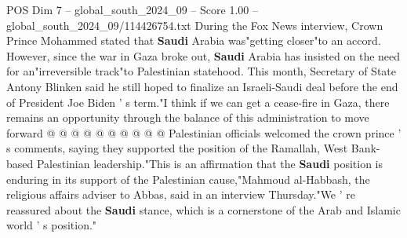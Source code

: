 \begin{textsample}{POS Dim 7 – global\_south\_2024\_09 – Score 1.00 – global\_south\_2024\_09/114426754.txt}
During the Fox News interview, Crown Prince Mohammed stated that \textbf{Saudi} Arabia was"getting closer"to an accord.
However, since the war in Gaza broke out, \textbf{Saudi} Arabia has insisted on the need for an"irreversible track"to Palestinian statehood.
This month, Secretary of State Antony Blinken said he still hoped to finalize an Israeli-Saudi deal before the end of President Joe Biden ' s term."I think if we can get a cease-fire in Gaza, there remains an opportunity through the balance of this administration to move forward @ @ @ @ @ @ @ @ @ @ Palestinian officials welcomed the crown prince ' s comments, saying they supported the position of the Ramallah, West Bank-based Palestinian leadership."This is an affirmation that the \textbf{Saudi} position is enduring in its support of the Palestinian cause,"Mahmoud al-Habbash, the religious affairs adviser to Abbas, said in an interview Thursday."We ' re reassured about the \textbf{Saudi} stance, which is a cornerstone of the Arab and Islamic world ' s position."

\end{textsample}
